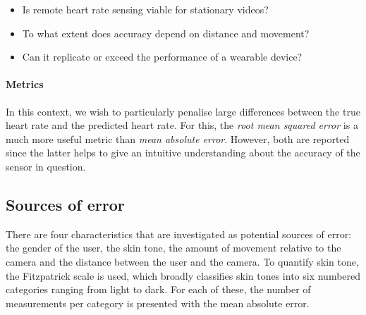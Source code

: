 % 
\begin{itemize}
    \item Is remote heart rate sensing viable for stationary videos?
    \item To what extent does accuracy depend on distance and movement?
    \item Can it replicate or exceed the performance of a wearable device?
\end{itemize}

\paragraph{Metrics}
In this context, we wish to particularly penalise large differences between the true heart rate and the predicted heart rate. For this, 
the \textit{root mean squared error} is a much more useful metric than \textit{mean absolute error}. However, both are reported since the latter helps
to give an intuitive understanding about the accuracy of the sensor in question.


\subsection{Sources of error}
There are four characteristics that are investigated as potential sources of error: the gender of the user, the skin tone, the amount of movement
relative to the camera and the distance between the user and the camera.
To quantify skin tone, the Fitzpatrick scale\cite{Fitzpatrick} is used, which broadly classifies skin tones into six numbered categories ranging from light to dark.
For each of these, the number of measurements per category is presented with the mean absolute error. 

